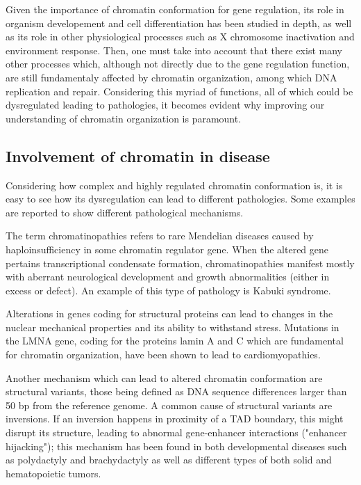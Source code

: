 Given the importance of chromatin conformation for gene regulation, its role in organism developement and cell differentiation has been studied in depth\cite{chromatindevelopment2019}, as well as its role in other physiological processes such as X chromosome inactivation\cite{xsilencing2017} and environment response\cite{epigeneticsenvironment2019}. Then, one must take into account that there exist many other processes which, although not directly due to the gene regulation function, are still fundamentaly affected by chromatin organization, among which DNA replication\cite{chromatinreplication2017} and repair\cite{chromatinrepair2017}. Considering this myriad of functions, all of which could be dysregulated leading to pathologies, it becomes evident why improving our understanding of chromatin organization is paramount.

\subsection{Involvement of chromatin in disease}
Considering how complex and highly regulated chromatin conformation is, it is easy to see how its dysregulation can lead to different pathologies. Some examples are reported to show different pathological mechanisms.

The term chromatinopathies refers to rare Mendelian diseases caused by haploinsufficiency in some chromatin regulator gene. When the altered gene pertains transcriptional condensate formation, chromatinopathies manifest mostly with aberrant neurological development and growth abnormalities (either in excess or defect). An example of this type of pathology is Kabuki syndrome\cite{condensates2023}.

Alterations in genes coding for structural proteins can lead to changes in the nuclear mechanical properties and its ability to withstand stress. Mutations in the LMNA gene, coding for the proteins lamin A and C which are fundamental for chromatin organization, have been shown to lead to cardiomyopathies\cite{chromatincardiomyopathy2021}. 

Another mechanism which can lead to altered chromatin conformation are structural variants, those being defined as DNA sequence differences larger than 50 bp from the reference genome\cite{sequencevariations2023}. A common cause of structural variants are inversions. If an inversion happens in proximity of a TAD boundary, this might disrupt its structure, leading to abnormal gene-enhancer interactions ("enhancer hijacking"); this mechanism has been found in both developmental diseases such as polydactyly and brachydactyly\cite{epigeneticlimb2015} as well as different types of both solid and hematopoietic tumors\cite{chromatincancer2022, sequencevariations2023}.


